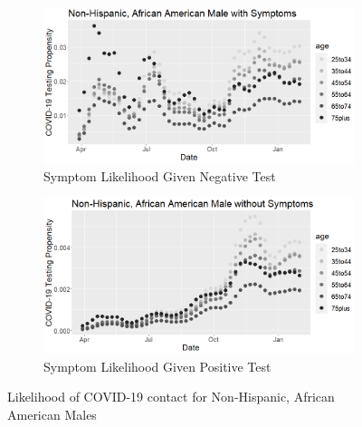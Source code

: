 \documentclass[12pt]{amsart}
\numberwithin{equation}{section}
\theoremstyle{plain}
\begin{document}
\begin{figure}[!th]
\centering
\begin{subfigure}{.5\textwidth}
 \centering
 \includegraphics[width=.9\linewidth]{../figs/tvprop_alt_fig1_supp1.png}
 \caption{Symptom Likelihood Given Negative Test}
\end{subfigure}%
\begin{subfigure}{.5\textwidth}
 \centering
\includegraphics[width=.9\linewidth]{../figs/tvprop_alt_fig2_supp1.png}
 \caption{Symptom Likelihood Given Positive Test}
\end{subfigure}
\caption{Likelihood of COVID-19 contact for Non-Hispanic, African American Males}
\label{fig:nonh-aa-male}
\end{figure}
\end{document}
